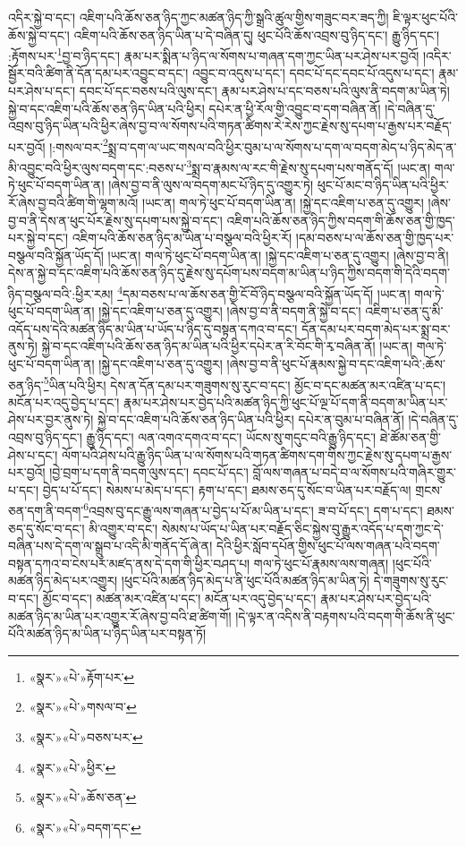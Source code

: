 འདིར་སྐྱེ་བ་དང་། འཇིག་པའི་ཆོས་ཅན་ཉིད་ཀྱང་མཚན་ཉིད་ཀྱི་སྒྲའི་ཚུལ་གྱིས་གཟུང་བར་ཟད་ཀྱི། ཇི་ལྟར་ཕུང་པོའི་ཆོས་སྐྱེ་བ་དང་། འཇིག་པའི་ཆོས་ཅན་ཉིད་ཡིན་པ་དེ་བཞིན་དུ། ཕུང་པོའི་ཆོས་འབྲས་བུ་ཉིད་དང་། རྒྱུ་ཉིད་དང་། :རྟོགས་པར་\footnote{«སྣར་»«པེ་»རྟོག་པར་}བྱ་བ་ཉིད་དང་། རྣམ་པར་སྨིན་པ་ཉིད་ལ་སོགས་པ་གཞན་དག་ཀྱང་ཡིན་པར་ཤེས་པར་བྱའོ། །འདིར་སྦྱོར་བའི་ཚིག་ནི་དོན་དམ་པར་འབྱུང་བ་དང་། འབྱུང་བ་འདུས་པ་དང་། དབང་པོ་དང་དབང་པོ་འདུས་པ་དང་། རྣམ་པར་ཤེས་པ་དང་། དབང་པོ་དང་བཅས་པའི་ལུས་དང་། རྣམ་པར་ཤེས་པ་དང་བཅས་པའི་ལུས་ནི་བདག་མ་ཡིན་ཏེ། སྐྱེ་བ་དང་འཇིག་པའི་ཆོས་ཅན་ཉིད་ཡིན་པའི་ཕྱིར། དཔེར་ན་ཕྱི་རོལ་གྱི་འབྱུང་བ་དག་བཞིན་ནོ། །དེ་བཞིན་དུ་འབྲས་བུ་ཉིད་ཡིན་པའི་ཕྱིར་ཞེས་བྱ་བ་ལ་སོགས་པའི་གཏན་ཚིགས་རེ་རེས་ཀྱང་རྗེས་སུ་དཔག་པ་རྒྱས་པར་བརྗོད་པར་བྱའོ། །:གསལ་བར་\footnote{«སྣར་»«པེ་»གསལ་བ་}སྨྲ་བ་དག་ལ་ཡང་གསལ་བའི་ཕྱིར་བུམ་པ་ལ་སོགས་པ་དག་ལ་བདག་མེད་པ་ཉིད་མེད་ན་མི་འབྱུང་བའི་ཕྱིར་ལུས་བདག་དང་:བཅས་པ་\footnote{«སྣར་»«པེ་»བཅས་པར་}སྨྲ་བ་རྣམས་ལ་རང་གི་རྗེས་སུ་དཔག་པས་གནོད་དོ། །ཡང་ན། གལ་ཏེ་ཕུང་པོ་བདག་ཡིན་ན། །ཞེས་བྱ་བ་ནི་ལུས་ལ་བདག་མང་པོ་ཉིད་དུ་འགྱུར་ཏེ། ཕུང་པོ་མང་བ་ཉིད་ཡིན་པའི་ཕྱིར་རོ་ཞེས་བྱ་བའི་ཚིག་གི་ལྷག་མའོ། །ཡང་ན། གལ་ཏེ་ཕུང་པོ་བདག་ཡིན་ན། །སྐྱེ་དང་འཇིག་པ་ཅན་དུ་འགྱུར། །ཞེས་བྱ་བ་ནི་དེས་ན་ཕུང་པོར་རྗེས་སུ་དཔག་པས་སྐྱེ་བ་དང་། འཇིག་པའི་ཆོས་ཅན་ཉིད་ཀྱིས་བདག་གི་ཆོས་ཅན་གྱི་ཁྱད་པར་སྐྱེ་བ་དང་། འཇིག་པའི་ཆོས་ཅན་ཉིད་མ་ཡིན་པ་བསྩལ་བའི་ཕྱིར་རོ། །དམ་བཅས་པ་ལ་ཆོས་ཅན་གྱི་ཁྱད་པར་བསྩལ་བའི་སྐྱོན་ཡོད་དོ། །ཡང་ན། གལ་ཏེ་ཕུང་པོ་བདག་ཡིན་ན། །སྐྱེ་དང་འཇིག་པ་ཅན་དུ་འགྱུར། །ཞེས་བྱ་བ་ནི། དེས་ན་སྐྱེ་བ་དང་འཇིག་པའི་ཆོས་ཅན་ཉིད་དུ་རྗེས་སུ་དཔོག་པས་བདག་མ་ཡིན་པ་ཉིད་ཀྱིས་བདག་གི་དེའི་བདག་ཉིད་བསྩལ་བའི་:ཕྱིར་རམ། \footnote{«སྣར་»«པེ་»ཕྱིར་}དམ་བཅས་པ་ལ་ཆོས་ཅན་གྱི་ངོ་བོ་ཉིད་བསྩལ་བའི་སྐྱོན་ཡོད་དོ། །ཡང་ན། གལ་ཏེ་ཕུང་པོ་བདག་ཡིན་ན། །སྐྱེ་དང་འཇིག་པ་ཅན་དུ་འགྱུར། །ཞེས་བྱ་བ་ནི་བདག་ནི་སྐྱེ་བ་དང་། འཇིག་པ་ཅན་དུ་མི་འདོད་པས་དེའི་མཚན་ཉིད་མ་ཡིན་པ་ཡོད་པ་ཉིད་དུ་བསྟན་དཀའ་བ་དང་། དོན་དམ་པར་བདག་མེད་པར་སྨྲ་བར་ནུས་ཏེ། སྐྱེ་བ་དང་འཇིག་པའི་ཆོས་ཅན་ཉིད་མ་ཡིན་པའི་ཕྱིར་དཔེར་ན་རི་བོང་གི་རྭ་བཞིན་ནོ། །ཡང་ན། གལ་ཏེ་ཕུང་པོ་བདག་ཡིན་ན། །སྐྱེ་དང་འཇིག་པ་ཅན་དུ་འགྱུར། །ཞེས་བྱ་བ་ནི་ཕུང་པོ་རྣམས་སྐྱེ་བ་དང་འཇིག་པའི་:ཆོས་ཅན་ཉིད་\footnote{«སྣར་»«པེ་»ཆོས་ཅན་}ཡིན་པའི་ཕྱིར། དེས་ན་དོན་དམ་པར་གཟུགས་སུ་རུང་བ་དང་། མྱོང་བ་དང་མཚན་མར་འཛིན་པ་དང་། མངོན་པར་འདུ་བྱེད་པ་དང་། རྣམ་པར་ཤེས་པར་བྱེད་པའི་མཚན་ཉིད་ཀྱི་ཕུང་པོ་ལྔ་པོ་དག་ནི་བདག་མ་ཡིན་པར་ཤེས་པར་བྱར་ནུས་ཏེ། སྐྱེ་བ་དང་འཇིག་པའི་ཆོས་ཅན་ཉིད་ཡིན་པའི་ཕྱིར། དཔེར་ན་བུམ་པ་བཞིན་ནོ། །དེ་བཞིན་དུ་འབྲས་བུ་ཉིད་དང་། རྒྱུ་ཉིད་དང་། ལན་འགའ་དགའ་བ་དང་། ཡོངས་སུ་གདུང་བའི་རྒྱུ་ཉིད་དང་། ཐེ་ཚོམ་ཅན་གྱི་ཤེས་པ་དང་། ལོག་པའི་ཤེས་པའི་རྒྱུ་ཉིད་ཡིན་པ་ལ་སོགས་པའི་གཏན་ཚིགས་དག་གིས་ཀྱང་རྗེས་སུ་དཔག་པ་རྒྱས་པར་བྱའོ། །བྱེ་བྲག་པ་དག་ནི་བདག་ལུས་དང་། དབང་པོ་དང་། བློ་ལས་གཞན་པ་བདེ་བ་ལ་སོགས་པའི་གཞིར་གྱུར་པ་དང་། བྱེད་པ་པོ་དང་། སེམས་པ་མེད་པ་དང་། རྟག་པ་དང་། ཐམས་ཅད་དུ་སོང་བ་ཡིན་པར་བརྗོད་ལ། གྲངས་ཅན་དག་ནི་བདག་\footnote{«སྣར་»«པེ་»བདག་དང་}འབྲས་བུ་དང་རྒྱུ་ལས་གཞན་པ་བྱེད་པ་པོ་མ་ཡིན་པ་དང་། ཟ་བ་པོ་དང་། དག་པ་དང་། ཐམས་ཅད་དུ་སོང་བ་དང་། མི་འགྱུར་བ་དང་། སེམས་པ་ཡོད་པ་ཡིན་པར་བརྗོད་ཅིང་སྐྱེས་བུ་རྒྱུར་འདོད་པ་དག་ཀྱང་དེ་བཞིན་པས་དེ་དག་ལ་སྒྲུབ་པ་འདི་མི་གནོད་དོ་ཞེ་ན། དེའི་ཕྱིར་སློབ་དཔོན་གྱིས་ཕུང་པོ་ལས་གཞན་པའི་བདག་བསྟན་དཀའ་བ་ངེས་པར་མཛད་ནས་དེ་དག་གི་ཕྱིར་བཤད་པ། གལ་ཏེ་ཕུང་པོ་རྣམས་ལས་གཞན། །ཕུང་པོའི་མཚན་ཉིད་མེད་པར་འགྱུར། །ཕུང་པོའི་མཚན་ཉིད་མེད་པ་ནི་ཕུང་པོའི་མཚན་ཉིད་མ་ཡིན་ཏེ། དེ་གཟུགས་སུ་རུང་བ་དང་། མྱོང་བ་དང་། མཚན་མར་འཛིན་པ་དང་། མངོན་པར་འདུ་བྱེད་པ་དང་། རྣམ་པར་ཤེས་པར་བྱེད་པའི་མཚན་ཉིད་མ་ཡིན་པར་འགྱུར་རོ་ཞེས་བྱ་བའི་ཐ་ཚིག་གོ། །དེ་ལྟར་ན་འདིས་ནི་བརྟགས་པའི་བདག་གི་ཆོས་ནི་ཕུང་པོའི་མཚན་ཉིད་མ་ཡིན་པ་ཉིད་ཡིན་པར་བསྟན་ཏོ། 